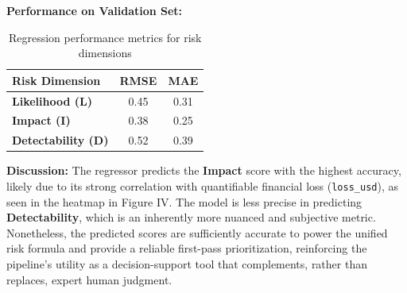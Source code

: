 \documentclass[a4paper]{article}
\begin{document}
\begin{multicols}{2}
\textbf{Performance on Validation Set:}

\begin{table}[H]
\centering
\begin{tabular}{lcc}
\toprule
\textbf{Risk Dimension} & \textbf{RMSE} & \textbf{MAE} \\
\midrule
\textbf{Likelihood (L)} & 0.45 & 0.31 \\
\textbf{Impact (I)} & 0.38 & 0.25 \\
\textbf{Detectability (D)} & 0.52 & 0.39 \\
\bottomrule
\end{tabular}
\caption{Regression performance metrics for risk dimensions}
\label{tab:regressor_performance}
\end{table}

\textbf{Discussion:} The regressor predicts the \textbf{Impact} score with the highest accuracy, likely due to its strong correlation with quantifiable financial loss (\texttt{loss\_usd}), as seen in the heatmap in Figure IV. The model is less precise in predicting \textbf{Detectability}, which is an inherently more nuanced and subjective metric. Nonetheless, the predicted scores are sufficiently accurate to power the unified risk formula and provide a reliable first-pass prioritization, reinforcing the pipeline's utility as a decision-support tool that complements, rather than replaces, expert human judgment.

\end{multicols}
\end{document}
